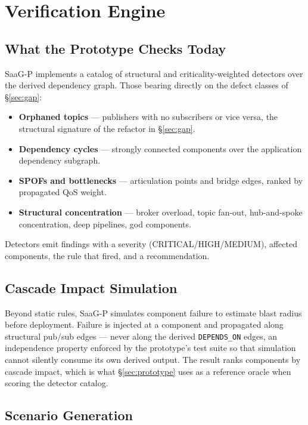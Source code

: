 \documentclass[sigconf,9pt]{acmart}
\begin{document}
\section{Verification Engine}
\label{sec:verification}

\subsection{What the Prototype Checks Today}
\label{sec:checks}

SaaG-P implements a catalog of structural and criticality-weighted detectors over the derived
dependency graph. Those bearing directly on the defect classes of \S\ref{sec:gap}:

\begin{itemize}
\item \textbf{Orphaned topics} --- publishers with no subscribers or vice versa, the structural
  signature of the refactor in \S\ref{sec:gap}.
\item \textbf{Dependency cycles} --- strongly connected components over the application dependency
  subgraph.
\item \textbf{SPOFs and bottlenecks} --- articulation points and bridge edges, ranked by
  propagated QoS weight.
\item \textbf{Structural concentration} --- broker overload, topic fan-out, hub-and-spoke
  concentration, deep pipelines, god components.
\end{itemize}

Detectors emit findings with a severity (CRITICAL/HIGH/MEDIUM), affected components, the rule
that fired, and a recommendation.

\subsection{Cascade Impact Simulation}
\label{sec:cascade}

Beyond static rules, SaaG-P simulates component failure to estimate blast radius before
deployment. Failure is injected at a component and propagated along structural pub/sub
edges --- never along the derived \texttt{DEPENDS\_ON} edges, an independence property enforced by
the prototype's test suite so that simulation cannot silently consume its own derived output. The
result ranks components by cascade impact, which is what \S\ref{sec:prototype} uses as a reference
oracle when scoring the detector catalog.

\subsection{Scenario Generation}
\label{sec:scenariogen}
\end{document}
